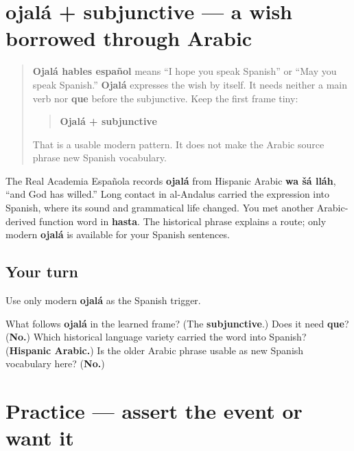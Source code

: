 \section[ojalá + subjunctive]{ojalá + subjunctive — a wish borrowed through Arabic}

\label{lesson:ES-C18-ojala}



\begin{quote}
\textbf{Ojalá hables español} means “I hope you speak Spanish” or “May you speak Spanish.” \textbf{Ojalá} expresses the wish by itself. It needs neither a main verb nor \textbf{que} before the subjunctive. Keep the first frame tiny:

\begin{quote}
\textbf{Ojalá + subjunctive}
\end{quote}

That is a usable modern pattern. It does not make the Arabic source phrase new Spanish vocabulary.
\end{quote}

\begin{cousinweb}
The Real Academia Española records \textbf{ojalá} from Hispanic Arabic \textbf{wa šá lláh}, “and God has willed.” Long contact in al-Andalus carried the expression into Spanish, where its sound and grammatical life changed. You met another Arabic-derived function word in \textbf{hasta}. The historical phrase explains a route; only modern \textbf{ojalá} is available for your Spanish sentences.
\end{cousinweb}

\subsection*{Your turn}
Use only modern \textbf{ojalá} as the Spanish trigger.

\begin{tcolorbox}[breakable,colback=teal!4,colframe=teal!35!black,title={Before you move on}]
What follows \textbf{ojalá} in the learned frame? (The \textbf{subjunctive}.) Does it need \textbf{que}? (\textbf{No.}) Which historical language variety carried the word into Spanish? (\textbf{Hispanic Arabic.}) Is the older Arabic phrase usable as new Spanish vocabulary here? (\textbf{No.})
\end{tcolorbox}
\section[Practice]{Practice — assert the event or want it}

